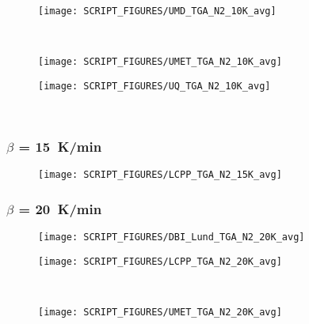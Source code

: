 \begin{landscape}
\begin{minipage}{0.65\textwidth}
\begin{figure}[H]
\end{figure}
\end{minipage} 
\begin{minipage}{0.35\textwidth}
\begin{figure}[H]
{\texttt{[image: SCRIPT\_FIGURES/UMD\_TGA\_N2\_10K\_avg]}}\\
\end{figure}
\end{minipage}\\
\begin{minipage}{0.65\textwidth}
\begin{figure}[H]
{\texttt{[image: SCRIPT\_FIGURES/UMET\_TGA\_N2\_10K\_avg]}}\\
\end{figure}
\end{minipage} 
\begin{minipage}{0.35\textwidth}
\begin{figure}[H]
{\texttt{[image: SCRIPT\_FIGURES/UQ\_TGA\_N2\_10K\_avg]}}\\
\end{figure}
\end{minipage}\\

\newpage
\subsubsection{$\beta$ = 15~K/min}
\begin{minipage}{0.65\textwidth}
\begin{figure}[H]
{\texttt{[image: SCRIPT\_FIGURES/LCPP\_TGA\_N2\_15K\_avg]}}\\
\end{figure}
\end{minipage} 

\newpage
\subsubsection{$\beta$ = 20~K/min}
\begin{minipage}{0.65\textwidth}
\begin{figure}[H]
{\texttt{[image: SCRIPT\_FIGURES/DBI\_Lund\_TGA\_N2\_20K\_avg]}}\\
\end{figure}
\end{minipage} 
\begin{minipage}{0.35\textwidth}
\begin{figure}[H]
{\texttt{[image: SCRIPT\_FIGURES/LCPP\_TGA\_N2\_20K\_avg]}}\\
\end{figure}
\end{minipage}\\
\begin{minipage}{0.65\textwidth}
\begin{figure}[H]
{\texttt{[image: SCRIPT\_FIGURES/UMET\_TGA\_N2\_20K\_avg]}}\\
\end{figure}
\end{minipage} 


\end{landscape}
